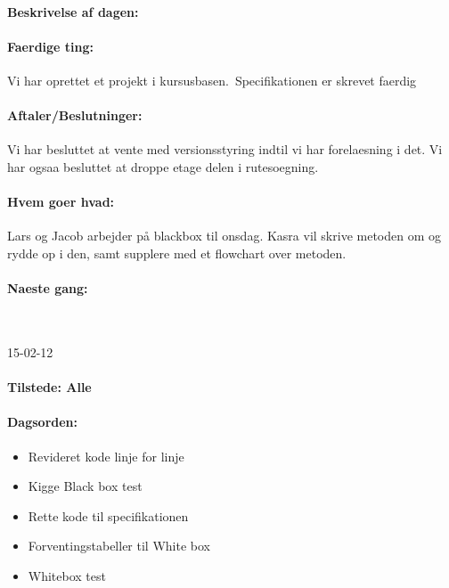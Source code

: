 \documentclass[a4paper,10pt,titlepage]{article}
\begin{document}
			\paragraph{Beskrivelse af dagen:}
			
			\paragraph{Faerdige ting:}
			Vi har oprettet et projekt i kursusbasen.\
			Specifikationen er skrevet faerdig
			
			\paragraph{Aftaler/Beslutninger:}
			Vi har besluttet at vente med versionsstyring indtil vi har forelaesning i det. Vi har ogsaa besluttet at droppe etage delen i rutesoegning. 
			
			\paragraph{Hvem goer hvad:}
			Lars og Jacob arbejder på blackbox til onsdag. Kasra vil skrive metoden om og rydde op i den, samt supplere med et flowchart over metoden.
			\paragraph{Naeste gang:}\mbox{}\\
			
			\begin{center}
		15-02-12
		\end{center}
				\paragraph{Tilstede: Alle}
				\paragraph{Dagsorden:}
				\begin{itemize}
					\item Revideret kode linje for linje
					\item Kigge Black box test
					\item Rette kode til specifikationen
					\item Forventingstabeller til White box
					\item Whitebox test
				\end{itemize}
				
\end{document}
